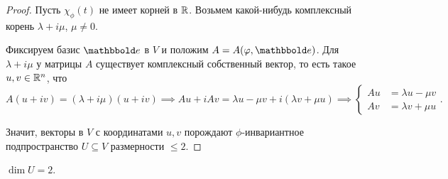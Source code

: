 \documentclass[a4paper]{article}
\begin{document}
\begin{colloq}
\begin{proof}
                Пусть $\chi_\phi(t)$ не имеет корней в $\mathbb{R}$. Возьмем какой-нибудь комплексный корень $\lambda + i \mu$, $\mu \neq 0$.

                Фиксируем базис $\E$ в $V$ и положим $A = A(\phi, \E)$. Для $\lambda + i \mu$ у матрицы $A$ существует комплексный собственный вектор, то есть такое $u, v \in \mathbb{R}^n$, что
                \begin{equation*}
                    A(u + iv) = (\lambda + i \mu) (u + i v) \implies Au + iAv = \lambda u - \mu v + i (\lambda v + \mu u) \implies \begin{cases}
                        Au &= \lambda u - \mu v \\
                        Av &= \lambda v + \mu u
                    \end{cases}
                .\end{equation*}
                
                Значит, векторы в $V$ с координатами $u, v$ порождают $\phi$-инвариантное подпространство $U \subseteq V$ размерности $ \leq 2$.
            \end{proof}

            \begin{exercise}
                $\dim U = 2$.
            \end{exercise}

    \end{colloq}
\end{document}
